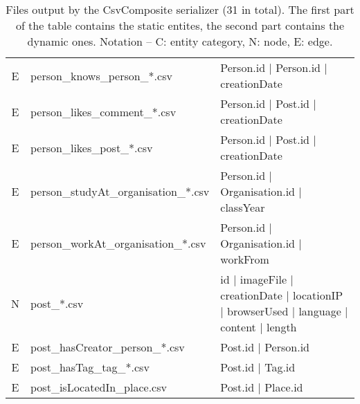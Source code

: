 \begin{table}[htb]
\begin{tabular}{|c|p{4.6cm}|p{11.4cm}|}
        E                       & person\_knows\_person\_*.csv            & Person.id | Person.id | creationDate                                                                        \\
        E                       & person\_likes\_comment\_*.csv           & Person.id | Post.id | creationDate                                                                          \\
        E                       & person\_likes\_post\_*.csv              & Person.id | Post.id | creationDate                                                                          \\
        E                       & person\_studyAt\_organisation\_*.csv    & Person.id | Organisation.id | classYear                                                                     \\
        E                       & person\_workAt\_organisation\_*.csv     & Person.id | Organisation.id | workFrom                                                                      \\
		\hline
        N                       & post\_*.csv                             & id | imageFile | creationDate | locationIP | browserUsed | language | content | length                      \\
        E                       & post\_hasCreator\_person\_*.csv         & Post.id | Person.id                                                                                         \\
        E                       & post\_hasTag\_tag\_*.csv                & Post.id | Tag.id                                                                                            \\
        E                       & post\_isLocatedIn\_place.csv            & Post.id | Place.id                                                                                          \\
        \hline
    \end{tabular}
    \caption{Files output by the CsvComposite serializer (31 in total). The first part of the table contains the static entites, the second part contains the dynamic ones. Notation -- C: entity category, N: node, E: edge.}
    \label{table:csv_composite}
\end{table}
